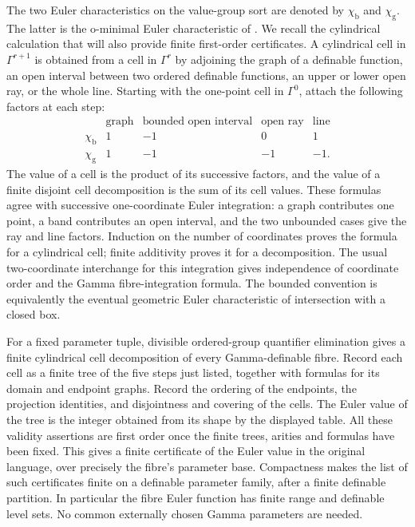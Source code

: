The two Euler characteristics on the value-group sort are denoted by
$\chi_{\mathrm b}$ and $\chi_{\mathrm g}$. The latter is the
o-minimal Euler characteristic of \cite[Chapter 4]{vdD}.
We recall the cylindrical
calculation that will also provide finite first-order certificates.
A cylindrical cell in $\Gamma^{r+1}$ is obtained from a cell in
$\Gamma^r$ by adjoining the graph of a definable function, an open
interval between two ordered definable functions, an upper or lower
open ray, or the whole line. Starting with the one-point cell in
$\Gamma^0$, attach the following factors at each step:
\[
\begin{array}{c|rrrr}
 &\text{graph}&\text{bounded open interval}&\text{open ray}&\text{line}\\ \hline
 \chi_{\mathrm b}&1&-1&0&1\\
 \chi_{\mathrm g}&1&-1&-1&-1.
\end{array}
\]
The value of a cell is the product of its successive factors, and the
value of a finite disjoint cell decomposition is the sum of its cell
values. These formulas agree with successive one-coordinate Euler
integration: a graph contributes one point, a band contributes an open
interval, and the two unbounded cases give the ray and line factors.
Induction on the number of coordinates proves the formula for a
cylindrical cell; finite additivity proves it for a decomposition.
The usual two-coordinate interchange for this integration gives
independence of coordinate order and the Gamma fibre-integration
formula. The bounded convention is equivalently the eventual geometric
Euler characteristic of intersection with a closed box.

For a fixed parameter tuple, divisible ordered-group quantifier
elimination gives a finite cylindrical cell decomposition of every
Gamma-definable fibre. Record each cell as a finite tree of the five
steps just listed, together with formulas for its domain and endpoint
graphs. Record the ordering of the endpoints, the projection identities,
and disjointness and covering of the cells. The Euler value of the tree
is the integer obtained from its shape by the displayed table.
All these validity assertions are first order once the finite trees,
arities and formulas have been fixed. This gives a finite certificate
of the Euler value in the original language, over precisely the fibre's
parameter base. Compactness makes the list of such certificates finite
on a definable parameter family, after a finite definable partition.
In particular the fibre Euler function has finite range and definable
level sets. No common externally chosen Gamma parameters are needed.

